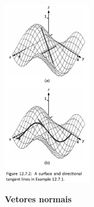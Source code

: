\documentclass[oneside,12pt]{article}
\begin{document}
{{%
\includegraphics[height=8cm]{2022-2-C3/APEX_calculus_fig_12.7.2.pdf}


}}

\newpage


\pu

\def\vecdx{{\vec{d}}_x}
\def\vecdy{{\vec{d}}_y}
\def\vecn {{\vec{n}}}
\def\nmat#1#2#3{\ensuremath{\pmat{#1 & \\ #2 & #3}}}

{\bf Vetores normais}
\end{document}

